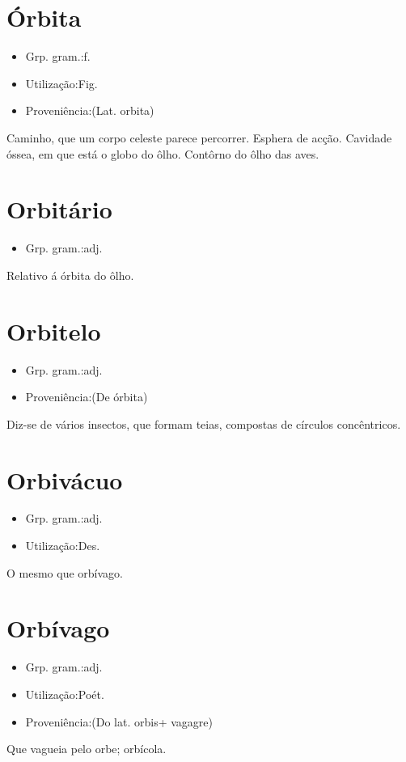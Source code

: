 \section{Órbita}
\begin{itemize}
\item {Grp. gram.:f.}
\end{itemize}
\begin{itemize}
\item {Utilização:Fig.}
\end{itemize}
\begin{itemize}
\item {Proveniência:(Lat. \textunderscore orbita\textunderscore )}
\end{itemize}
Caminho, que um corpo celeste parece percorrer.
Esphera de acção.
Cavidade óssea, em que está o globo do ôlho.
Contôrno do ôlho das aves.
\section{Orbitário}
\begin{itemize}
\item {Grp. gram.:adj.}
\end{itemize}
Relativo á órbita do ôlho.
\section{Orbitelo}
\begin{itemize}
\item {Grp. gram.:adj.}
\end{itemize}
\begin{itemize}
\item {Proveniência:(De \textunderscore órbita\textunderscore )}
\end{itemize}
Diz-se de vários insectos, que formam teias, compostas de círculos concêntricos.
\section{Orbivácuo}
\begin{itemize}
\item {Grp. gram.:adj.}
\end{itemize}
\begin{itemize}
\item {Utilização:Des.}
\end{itemize}
O mesmo que \textunderscore orbívago\textunderscore .
\section{Orbívago}
\begin{itemize}
\item {Grp. gram.:adj.}
\end{itemize}
\begin{itemize}
\item {Utilização:Poét.}
\end{itemize}
\begin{itemize}
\item {Proveniência:(Do lat. \textunderscore orbis\textunderscore  + \textunderscore vagagre\textunderscore )}
\end{itemize}
Que vagueia pelo orbe; orbícola.
